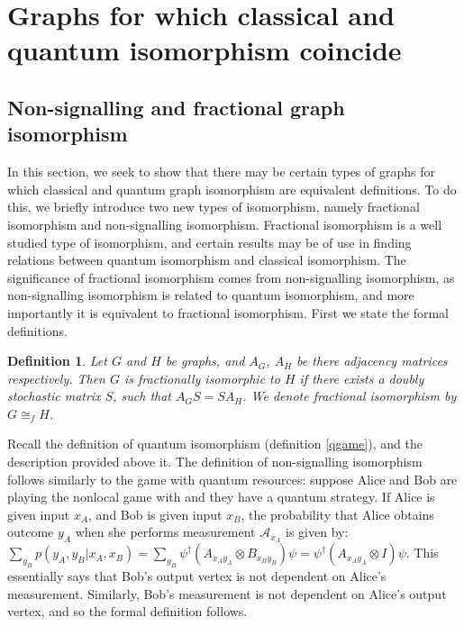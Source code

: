\documentclass[12pt]{article}
\newtheorem{defn}[thm]{Definition}
\begin{document}
\section{Graphs for which classical and quantum isomorphism coincide}

\subsection{Non-signalling and fractional graph isomorphism}

In this section, we seek to show that there may be certain types of
graphs for which classical and quantum graph isomorphism are
equivalent definitions. To do this, we briefly introduce two new types
of isomorphism, namely fractional isomorphism and non-signalling
isomorphism. Fractional isomorphism is a well studied type of
isomorphism, and certain results may be of use in finding relations
between quantum isomorphism and classical isomorphism. The
significance of fractional isomorphism comes from non-signalling
isomorphism, as non-signalling isomorphism is related to quantum
isomorphism, and more importantly it is equivalent to fractional
isomorphism. First we state the formal definitions.

\begin{defn}
  Let $G$ and $H$ be graphs, and $A_G$, $A_H$ be there adjacency
  matrices respectively. Then $G$ is fractionally isomorphic to $H$ if
  there exists a doubly stochastic matrix $S$, such that $A_GS =
  SA_H$. We denote fractional isomorphism by $G \cong_f H$.
\end{defn}

Recall the definition of quantum isomorphism (definition \ref{qgame}),
and the description provided above it. The definition of
non-signalling isomorphism follows similarly to the game with quantum
resources: suppose Alice and Bob are playing the nonlocal game with
and they have a quantum strategy. If Alice is given input $x_A$, and
Bob is given input $x_B$, the probability that Alice obtains outcome
$y_A$ when she performs measurement $\mathcal{A}_{x_A}$ is given by:
$\sum_{y_B}p(y_A, y_B | x_A, x_B) =
\sum_{y_B}\psi^\dag(A_{x_Ay_A}\otimes B_{x_By_B})\psi =
\psi^\dag(A_{x_Ay_A}\otimes I)\psi$. This essentially says that Bob's
output vertex is not dependent on Alice's measurement. Similarly,
Bob's measurement is not dependent on Alice's output vertex, and so
the formal definition follows.
\end{document}
